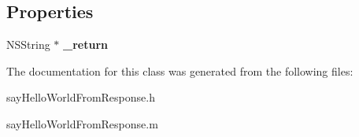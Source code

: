 \subsection*{Properties}
\begin{DoxyCompactItemize}
\item 
\hypertarget{interfacesay_hello_world_from_response_a1a7ada1655df5b3164280e5b74b2e609}{}N\+S\+String $\ast$ {\bfseries \+\_\+return}\label{interfacesay_hello_world_from_response_a1a7ada1655df5b3164280e5b74b2e609}

\end{DoxyCompactItemize}


The documentation for this class was generated from the following files\+:\begin{DoxyCompactItemize}
\item 
say\+Hello\+World\+From\+Response.\+h\item 
say\+Hello\+World\+From\+Response.\+m\end{DoxyCompactItemize}
